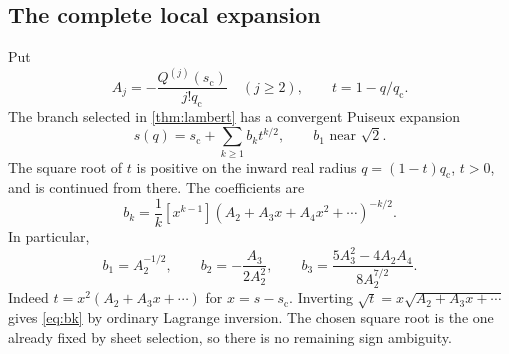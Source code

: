 \documentclass[11pt,a4paper]{article}
\numberwithin{equation}{section}
\theoremstyle{definition}
\theoremstyle{remark}
\newcommand{\scv}{s_{\mathrm c}}
\newcommand{\qcv}{q_{\mathrm c}}
\begin{document}
\subsection{The complete local expansion}
Put
\begin{equation}
 A_j=-\frac{Q^{(j)}(\scv)}{j!\qcv}\quad(j\geq2),
 \qquad t=1-q/\qcv.
 \label{eq:Aj}
\end{equation}
The branch selected in \cref{thm:lambert} has a convergent Puiseux expansion
\begin{equation}
 s(q)=\scv+\sum_{k\geq1}b_k t^{k/2},
 \qquad b_1\text{ near }\sqrt2.
 \label{eq:puiseux}
\end{equation}
The square root of $t$ is positive on the inward real radius $q=(1-t)\qcv$, $t>0$, and is continued from there. The coefficients are
\begin{equation}
 b_k=\frac1k[x^{k-1}]
       \left(A_2+A_3x+A_4x^2+\cdots\right)^{-k/2}.
 \label{eq:bk}
\end{equation}
In particular,
\begin{equation}
 b_1=A_2^{-1/2},\qquad
 b_2=-\frac{A_3}{2A_2^2},\qquad
 b_3=\frac{5A_3^2-4A_2A_4}{8A_2^{7/2}}.
 \label{eq:b123}
\end{equation}
Indeed $t=x^2(A_2+A_3x+\cdots)$ for $x=s-\scv$. Inverting $\sqrt t=x\sqrt{A_2+A_3x+\cdots}$ gives \eqref{eq:bk} by ordinary Lagrange inversion. The chosen square root is the one already fixed by sheet selection, so there is no remaining sign ambiguity.
\end{document}
